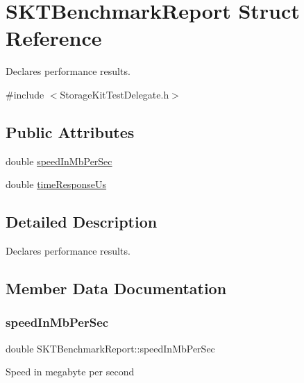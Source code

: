 \hypertarget{struct_s_k_t_benchmark_report}{}\section{S\+K\+T\+Benchmark\+Report Struct Reference}
\label{struct_s_k_t_benchmark_report}


Declares performance results.  




{\ttfamily \#include $<$Storage\+Kit\+Test\+Delegate.\+h$>$}

\subsection*{Public Attributes}
\begin{DoxyCompactItemize}
\item 
double \mbox{\hyperlink{struct_s_k_t_benchmark_report_abab287dd50707dd992a2b3abf25c425a}{speed\+In\+Mb\+Per\+Sec}}
\item 
double \mbox{\hyperlink{struct_s_k_t_benchmark_report_a2bea4b3a60fad4de1dc256cc4387dd4b}{time\+Response\+Us}}
\end{DoxyCompactItemize}


\subsection{Detailed Description}
Declares performance results. 

\subsection{Member Data Documentation}
\mbox{\label{struct_s_k_t_benchmark_report_abab287dd50707dd992a2b3abf25c425a}} 
\subsubsection{\texorpdfstring{speedInMbPerSec}{speedInMbPerSec}}
{\footnotesize\ttfamily double S\+K\+T\+Benchmark\+Report\+::speed\+In\+Mb\+Per\+Sec}

Speed in megabyte per second \mbox{\label{struct_s_k_t_benchmark_report_a2bea4b3a60fad4de1dc256cc4387dd4b}} 
